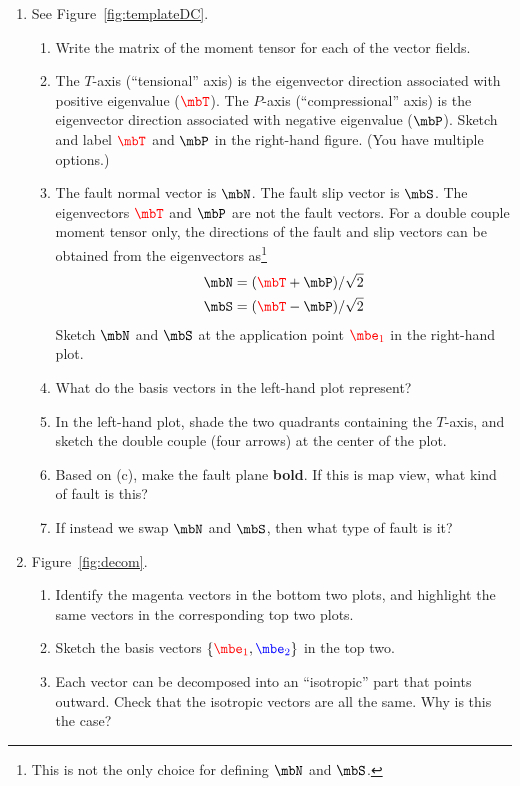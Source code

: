 \documentclass[11pt,titlepage,fleqn]{article}
\newcommand{\fvect}{\textcolor{red}{\mbT}}
\newcommand{\fvecp}{\textcolor{black}{\mbP}}
\newcommand{\fvecn}{\mbN}
\newcommand{\fvecs}{\mbS}
\newcommand{\eone}{\textcolor{red}{\mbe_1}}
\newcommand{\etwo}{\textcolor{blue}{\mbe_2}}
\begin{document}
\begin{enumerate}

\item 
\label{prob:DC}
See Figure~\ref{fig:templateDC}.
%
\begin{enumerate}
\item Write the matrix of the moment tensor for each of the vector fields.

\item The $T$-axis (``tensional'' axis) is the eigenvector direction associated with positive eigenvalue ($\fvect$). The $P$-axis (``compressional'' axis) is the eigenvector direction associated with negative eigenvalue ($\fvecp$). Sketch and label $\fvect$ and $\fvecp$ in the right-hand figure. (You have multiple options.)

\item The fault normal vector is $\fvecn$. The fault slip vector is $\fvecs$.
The eigenvectors $\fvect$ and $\fvecp$ are not the fault vectors.
For a double couple moment tensor only, the directions of the fault and slip vectors can be obtained from the eigenvectors as\footnote{This is not the only choice for defining $\fvecn$ and $\fvecs$.}
%
\begin{eqnarray*}
\fvecn = (\fvect + \fvecp)/\sqrt{2}
\\
\fvecs = (\fvect - \fvecp)/\sqrt{2}
\end{eqnarray*}
%
Sketch $\fvecn$ and $\fvecs$ at the application point $\eone$ in the right-hand plot.

\item What do the basis vectors in the left-hand plot represent?

\item In the left-hand plot, shade the two quadrants containing the $T$-axis, and sketch the double couple (four arrows) at the center of the plot.

\item Based on (c), make the fault plane {\bf bold}. If this is map view, what kind of fault is this?

\item If instead we swap $\fvecn$ and $\fvecs$, then what type of fault is it?
\end{enumerate}


\item 
\label{prob:decom}
Figure~\ref{fig:decom}.
%
\begin{enumerate}
\item Identify the magenta vectors in the bottom two plots, and highlight the same vectors in the corresponding top two plots.
\item Sketch the basis vectors $\{\eone,\etwo\}$ in the top two.
\item Each vector can be decomposed into an ``isotropic'' part that points outward. Check that the isotropic vectors are all the same. Why is this the case?
\end{enumerate}


\end{enumerate}
\end{document}
